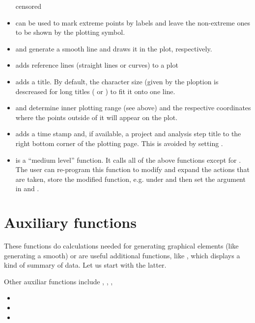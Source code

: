 \documentclass[11pt]{article}\usepackage[]{graphicx}\usepackage[]{color}
\begin{document}
\begin{itemize}
  censored
\item
   can be used to mark extreme points by labels and leave the
  non-extreme ones to be shown by the plotting symbol.
\item
   and  generate a smooth line and draws it 
  in the plot, respectively.
\item
   adds reference lines (straight lines or curves) to a plot
\item
   adds a title. By default, the character size 
  (given by the ploption  is descreased
  for long titles ( or ) to fit it onto one line.
\item
   and  determine inner plotting range 
  (see above) and the respective coordinates where the points outside of it
  will appear on the plot.
\item
   adds a time stamp and, if available, a project and analysis
  step title to the right bottom corner of the plotting page.
  This is avoided by setting .
\item
   is a ``medium level'' function. It calls all of the above
  functions except for . 
  The user can re-program this function to modify and expand the actions that
  are taken, store the modified function, e.g. under 
  and then set %
  the argument  in  and .
\end{itemize}

\section{Auxiliary functions}
These functions do calculations needed for generating graphical elements
(like generating a smooth) or are useful additional functions,
like , which displays a kind of summary of data.
Let us start with the latter.

Other auxiliar functions include
,
,
,


\begin{itemize}
\item
\item 
\item
\end{itemize}
\end{document}
